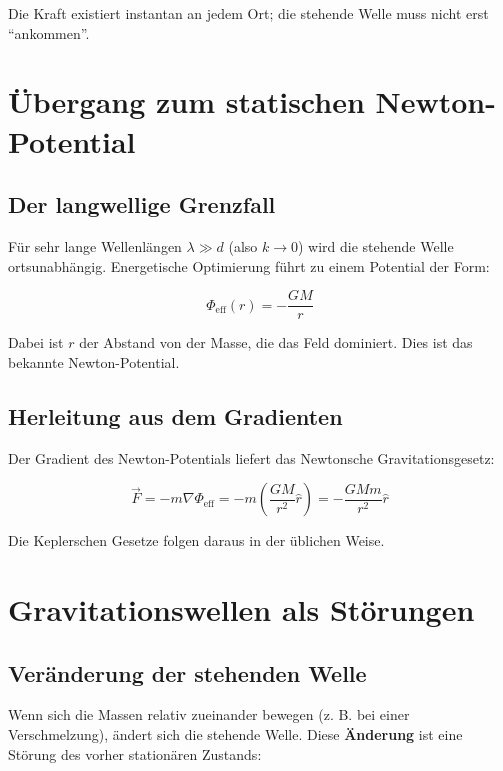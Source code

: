 \documentclass[11pt]{article}
\begin{document}
Die Kraft existiert instantan an jedem Ort; die stehende Welle muss nicht erst \enquote{ankommen}.

\section{Übergang zum statischen Newton-Potential}

\subsection{Der langwellige Grenzfall}

Für sehr lange Wellenlängen \(\lambda \gg d\) (also \(k \to 0\)) wird die stehende Welle ortsunabhängig. Energetische Optimierung führt zu einem Potential der Form:

\begin{equation}
    \Phi_{\text{eff}}(r) = -\frac{GM}{r}
\end{equation}

Dabei ist \(r\) der Abstand von der Masse, die das Feld dominiert. Dies ist das bekannte Newton-Potential.

\subsection{Herleitung aus dem Gradienten}

Der Gradient des Newton-Potentials liefert das Newtonsche Gravitationsgesetz:

\begin{equation}
    \vec{F} = -m \nabla \Phi_{\text{eff}} = -m \left( \frac{GM}{r^2} \hat{r} \right) = -\frac{GMm}{r^2} \hat{r}
\end{equation}

Die Keplerschen Gesetze folgen daraus in der üblichen Weise.

\section{Gravitationswellen als Störungen}

\subsection{Veränderung der stehenden Welle}

Wenn sich die Massen relativ zueinander bewegen (z. B. bei einer Verschmelzung), ändert sich die stehende Welle. Diese \textbf{Änderung} ist eine Störung des vorher stationären Zustands:
\end{document}
